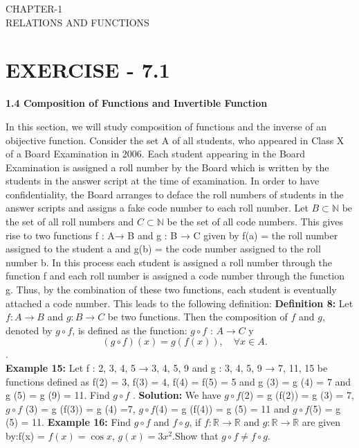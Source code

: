 \documentclass[12pt]{article}
\begin{document}
\begin{center}
\textbf\large{CHAPTER-1 \\  RELATIONS AND FUNCTIONS}
\end{center}
 
\section*{EXERCISE - 7.1}
\textbf{1.4 Composition of Functions and Invertible Function}

In this section, we will study composition of functions and the inverse of an obijective function. Consider the set A of all students, who appeared in Class X of a Board Examination in 2006. Each student appearing in the Board Examination is assigned a roll number by the Board which is written by the students in the answer script at the time of examination. In order to have confidentiality, the Board arranges to deface the roll numbers of students in the answer scripts and assigns a fake code number to each roll number. Let \( B \subset \mathbb{N} \) be the set of all roll numbers and \( C \subset \mathbb{N} \) be the set of all code numbers. This gives rise to two functions f : A→ B and g : B → C given by f(a) = the roll number assigned to the student a and g(b) = the code number assigned to the roll number b. In this process each student is assigned a roll number through the function f and each roll number is assigned a code number through the function g. Thus, by the combination of these two functions, each student is eventually attached a code number.
This leads to the following definition: \newline
\textbf{Definition 8:} Let \( f: A \to B \) and \( g: B \to C \) be two functions. Then the composition of \( f \) and \( g \), denoted by \( g \circ f \), is defined as the function:
\( g \circ f \) : \( A \to C \)  y
\[\quad (g \circ f)(x) = g(f(x)), \quad \forall x \in A.
\]. 
\\
\textbf{Example 15:} Let f : {2, 3, 4, 5} → {3, 4, 5, 9} and g : {3, 4, 5, 9} → {7, 11, 15} be functions defined as f(2) = 3, f(3) = 4, f(4) = f(5) = 5 and g (3) = g (4) = 7 and g (5) = g (9) = 11. Find \( g \circ f \) .\newline
\textbf{Solution:} We have \( g \circ f \)(2) = g (f(2)) = g (3) = 7, \( g \circ f \) (3) = g (f(3)) = g (4) =7,
\( g \circ f \)(4) = g (f(4)) = g (5) = 11 and \( g \circ f \)(5) = g (5) = 11.\newline
\textbf{Example 16:}  
Find \( g \circ f \) and \( f \circ g \), if \( f: \mathbb{R} \to \mathbb{R} \) and \( g: \mathbb{R} \to \mathbb{R} \) are given by:f(x) = \( f(x) = \cos x \), \( g(x) = 3x^2 \).Show that \( g \circ f \neq f \circ g \).\newline
\end{document}
